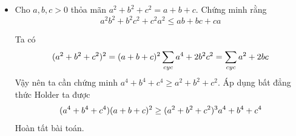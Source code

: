 \documentclass[11pt]{scrartcl}
\begin{document}
\begin{itemize}[label=, leftmargin=0em, itemsep=0.5em]
        \item\begin{btvn}
            Cho $a,b,c > 0$ thỏa mãn $a^2 + b^2 + c^2 = a + b + c$. Chứng minh rằng 
            \[
                a^2b^2 + b^2c^2 + c^2a^2 \leq ab + bc + ca
            \]
        \end{btvn}
        \begin{sol}
            Ta có 
            \[
                (a^2 + b^2 + c^2)^2 = (a + b + c)^2 \lra \sum_{cyc}a^4 + 2b^2c^2 = \sum_{cyc}a^2 + 2bc
            \]
            Vậy nên ta cần chứng minh $a^4 + b^4 + c^4 \geq a^2 + b^2 + c^2$. Áp dụng bất đẳng thức Holder ta được
            \[
                (a^4 + b^4 + c^4)(a + b + c)^2 \geq (a^2 + b^2 + c^2)^3 \lra a^4 + b^4 + c^4
            \]
            Hoàn tất bài toán.
        \end{sol}
        
    
    

\end{itemize}
\end{document}
